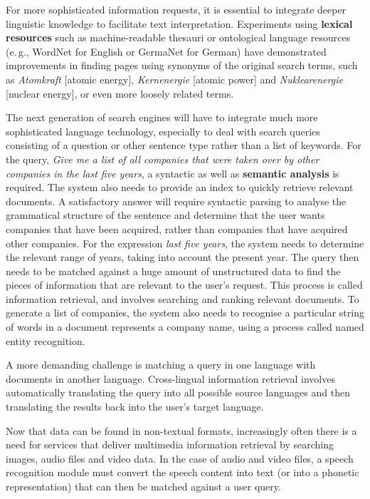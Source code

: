 \begin{multicols}{2}
For more sophisticated information requests, it is essential to integrate deeper linguistic knowledge to facilitate text interpretation. Experiments using \textbf{lexical resources} such as machine-readable thesauri or ontological language resources (e.\,g., WordNet for English or GermaNet for German) have demonstrated improvements in finding pages using synonyms of the original search terms, such as \textit{Atomkraft} {[}atomic energy{]}, \textit{Kernenergie} {[}atomic power{]} and \textit{Nuklearenergie} {[}nuclear energy{]}, or even more loosely related terms.


The next generation of search engines will have to integrate much more sophisticated language technology, especially to deal with search queries consisting of a question or other sentence type rather than a list of keywords. For the query, \textit{Give me a list of all companies that were taken over by other companies in the last five years}, a syntactic as well as \textbf{semantic analysis} is required. The system also needs to provide an index to quickly retrieve relevant documents. A satisfactory answer will require syntactic parsing to analyse the grammatical structure of the sentence and determine that the user wants companies that have been acquired, rather than companies that have acquired other companies. For the expression \textit{last five years}, the system needs to determine the relevant range of years, taking into account the present year. The query then needs to be matched against a huge amount of unstructured data to find the pieces of information that are relevant to the user’s request. This process is called information retrieval, and involves searching and ranking relevant documents. To generate a list of companies, the system also needs to recognise a particular string of words in a document represents a company name, using a process called named entity recognition.

A more demanding challenge is matching a query in one language with documents in another language. Cross-lingual information retrieval involves automatically translating the query into all possible source languages and then translating the results back into the user's target language.

Now that data can be found in non-textual formats, increasingly often there is a need for services that deliver multimedia information retrieval by searching images, audio files and video data. In the case of audio and video files, a speech recognition module must convert the speech content into text (or into a phonetic representation) that can then be matched against a user query.


\end{multicols}
